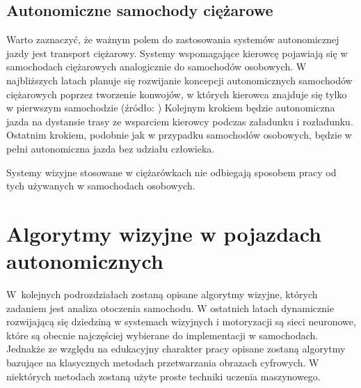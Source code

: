 \subsection{Autonomiczne samochody ciężarowe}

Warto zaznaczyć, że ważnym polem do zastosowania systemów autonomicznej jazdy jest transport ciężarowy. %
Systemy wspomagające kierowcę pojawiają się w samochodach ciężarowych analogicznie do samochodów osobowych. %
W najbliższych latach planuje się rozwijanie koncepcji autonomicznych samochodów ciężarowych poprzez tworzenie konwojów, w których kierowca znajduje się tylko w pierwszym samochodzie (źródło: \cite{W4})%
Kolejnym krokiem będzie autonomiczna jazda na dystansie trasy ze wsparciem kierowcy podczas załadunku i rozładunku. 
Ostatnim krokiem, podobnie jak w przypadku samochodów osobowych, będzie w pełni autonomiczna jazda bez udziału człowieka.

Systemy wizyjne stosowane w ciężarówkach nie odbiegają sposobem pracy od tych używanych w samochodach osobowych.





\section{Algorytmy wizyjne w pojazdach autonomicznych}
W~kolejnych podrozdziałach zostaną opisane algorytmy wizyjne, których zadaniem jest analiza otoczenia samochodu. %
W ostatnich latach dynamicznie rozwijającą się dziedziną w systemach wizyjnych i motoryzacji są sieci neuronowe, które są obecnie najczęściej wybierane do implementacji w samochodach. 
Jednakże ze względu na edukacyjny charakter pracy opisane zostaną algorytmy bazujące na klasycznych metodach przetwarzania obrazach cyfrowych. %
W niektórych metodach zostaną użyte proste techniki uczenia maszynowego.

